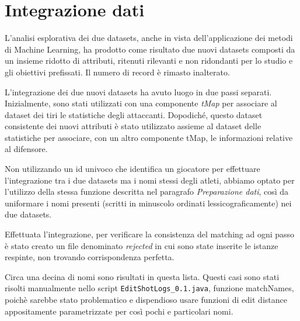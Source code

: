 \chapter{Integrazione dati}

L’analisi esplorativa dei due datasets, anche in vista dell’applicazione dei metodi di Machine Learning, ha prodotto come risultato due nuovi datasets composti da un insieme ridotto di attributi, ritenuti rilevanti e non ridondanti per lo studio e gli obiettivi prefissati. Il numero di record è rimasto inalterato.
\par
L’integrazione dei due nuovi datasets ha avuto luogo in due passi separati. Inizialmente, sono stati utilizzati con una componente \textit{tMap} per associare al dataset dei tiri le statistiche degli attaccanti. Dopodiché, questo dataset consistente dei nuovi attributi è stato utilizzato assieme al dataset delle statistiche per associare, con un altro componente tMap, le informazioni relative al difensore.
\par
Non utilizzando un id univoco che identifica un giocatore per effettuare l’integrazione tra i due datasets ma i nomi stessi degli atleti, abbiamo optato per l’utilizzo della stessa funzione descritta nel paragrafo \textit{Preparazione dati}, così da uniformare i nomi presenti (scritti in minuscolo ordinati lessicograficamente) nei due datasets. 
\par
Effettuata l’integrazione, per verificare la consistenza del matching ad ogni passo è stato creato un file denominato \textit{rejected} in cui sono state inserite le istanze respinte, non trovando corrispondenza perfetta.
\par
Circa una decina di nomi sono risultati in questa lista. Questi casi sono stati risolti manualmente nello script \texttt{EditShotLogs\_0.1.java}, funzione matchNames, poichè sarebbe stato problematico e dispendioso usare funzioni di edit distance appositamente parametrizzate per così pochi e particolari nomi.

